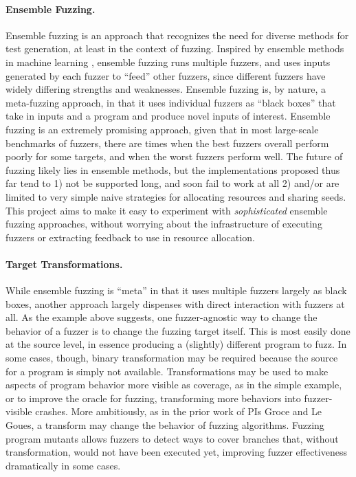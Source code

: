 \paragraph{Ensemble Fuzzing.}   Ensemble fuzzing \cite{chen2019enfuzz,ensemble,pastis} is an 
approach that recognizes the need for
diverse methods for test generation, at least in the context of
fuzzing.   Inspired by ensemble methods in machine learning 
\cite{dietterich2002ensemble},
ensemble fuzzing runs multiple fuzzers, and uses inputs generated by
each fuzzer to ``feed'' other fuzzers, since different fuzzers have widely 
differing strengths and weaknesses. Ensemble fuzzing is, by nature, a 
meta-fuzzing approach, in that it uses individual fuzzers as ``black boxes'' 
that take in inputs and a program and produce novel inputs of interest.  
Ensemble fuzzing is an extremely promising approach, given that in most 
large-scale benchmarks of fuzzers, there are times when the best fuzzers 
overall perform poorly for some targets, and when the worst fuzzers perform 
well.  The future of fuzzing likely lies in ensemble methods, but the 
implementations proposed thus far tend to 1) not be supported long, and soon 
fail to work at all 2) and/or are limited to very simple naive strategies for 
allocating resources and sharing seeds. This
project aims to make it easy to 
experiment with \emph{sophisticated} ensemble fuzzing approaches, without 
worrying about the infrastructure of executing fuzzers or extracting feedback 
to use in resource allocation.

\paragraph{Target Transformations.}  While ensemble fuzzing is ``meta'' in that 
it uses multiple fuzzers largely as black boxes, another approach largely 
dispenses with direct interaction with fuzzers at all.  As the example above 
suggests, one fuzzer-agnostic way to change the behavior of a fuzzer is to 
change the fuzzing target itself.  This is most easily done at the source 
level, in essence producing a (slightly) different program to fuzz.  In some 
cases, though, binary transformation may be required because the
source for a program is simply not available.   Transformations may be used to make aspects of 
program behavior more visible as coverage, as in the simple example, or to 
improve the oracle for fuzzing, transforming more behaviors into fuzzer-visible 
crashes.  More ambitiously, as in the prior work of PIs Groce and Le Goues, a 
transform may change the behavior of fuzzing algorithms.  Fuzzing program 
mutants allows fuzzers to detect ways to cover branches that, without 
transformation, would not have been executed yet, improving fuzzer 
effectiveness dramatically in some cases.

